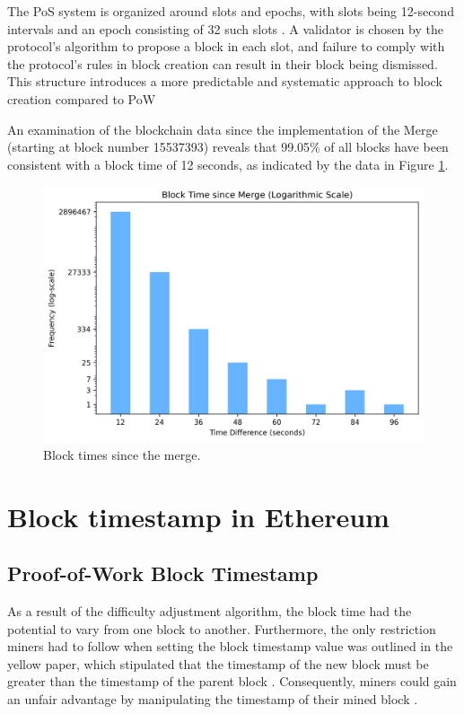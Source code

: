 The PoS system is organized around slots and epochs, with slots being 12-second
intervals and an epoch consisting of 32 such slots
\cite{seconds-per-slot-mainnet}\cite{seconds-per-slot-mainnet-doc}. A validator
is chosen by
the protocol's algorithm to propose a block in each slot, and failure to comply
with the protocol's rules in block creation can result in their block being
dismissed. This structure introduces a more predictable and systematic approach
to block creation compared to PoW

An examination of the blockchain data since the implementation of the Merge
(starting at block number 15537393) reveals that 99.05\% of all blocks have been
consistent with a block time of 12 seconds, as indicated by the data in Figure
\ref{fig:block_time_analysis}.

\begin{figure}[H]
  \centering
  \includegraphics[width=1\textwidth]{block_time_analysis/pos_block_time_bar_chart.png}
  \caption{Block times since the merge.}
  \label{fig:block_time_analysis}
\end{figure}

\section{Block timestamp in Ethereum}
\subsection{Proof-of-Work Block Timestamp}
As a result of the difficulty adjustment algorithm, the block time had the
potential to vary from one block to another. Furthermore, the only restriction
miners had to follow when setting the block timestamp value was outlined in the
yellow paper, which stipulated that the timestamp of the new block must be
greater than the timestamp of the parent block \cite{ethyellowpaper2023}.
Consequently, miners could gain an unfair advantage by manipulating the
timestamp of their mined block \cite{swc116}.


